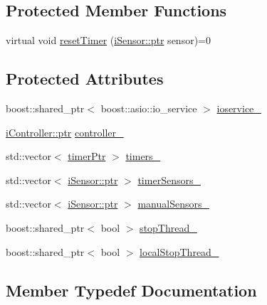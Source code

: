 \subsection*{Protected Member Functions}
\begin{DoxyCompactItemize}
\item 
virtual void \hyperlink{classo_cpt_1_1i_boatswain_a863c877ec067c55b5e06a04d0d9648ce}{reset\+Timer} (\hyperlink{classo_cpt_1_1i_sensor_a03533d2c5dc66e332d70dbb3b5e3006a}{i\+Sensor\+::ptr} sensor)=0
\end{DoxyCompactItemize}
\subsection*{Protected Attributes}
\begin{DoxyCompactItemize}
\item 
boost\+::shared\+\_\+ptr$<$ boost\+::asio\+::io\+\_\+service $>$ \hyperlink{classo_cpt_1_1i_boatswain_a95b337b39962f9c63fd82b500351a960}{ioservice\+\_\+}
\item 
\hyperlink{classo_cpt_1_1i_controller_a6d89a95cd6ad68bb74adfaca2f36370f}{i\+Controller\+::ptr} \hyperlink{classo_cpt_1_1i_boatswain_aafdc26c1366e4eee9cb156c5b6d705cf}{controller\+\_\+}
\item 
std\+::vector$<$ \hyperlink{classo_cpt_1_1i_boatswain_ac42d91dd3964880be9475ccaab4231cd}{timer\+Ptr} $>$ \hyperlink{classo_cpt_1_1i_boatswain_a22f6f6b95b832600c9dc1827589dca3c}{timers\+\_\+}
\item 
std\+::vector$<$ \hyperlink{classo_cpt_1_1i_sensor_a03533d2c5dc66e332d70dbb3b5e3006a}{i\+Sensor\+::ptr} $>$ \hyperlink{classo_cpt_1_1i_boatswain_ac25402266e3daa376e407a9f5ba73130}{timer\+Sensors\+\_\+}
\item 
std\+::vector$<$ \hyperlink{classo_cpt_1_1i_sensor_a03533d2c5dc66e332d70dbb3b5e3006a}{i\+Sensor\+::ptr} $>$ \hyperlink{classo_cpt_1_1i_boatswain_a1b58c7613d0dae24536f2db2e0510799}{manual\+Sensors\+\_\+}
\item 
boost\+::shared\+\_\+ptr$<$ bool $>$ \hyperlink{classo_cpt_1_1i_boatswain_a2fd1fb91df1788bb070ff4e7b7cf2c15}{stop\+Thread\+\_\+}
\item 
boost\+::shared\+\_\+ptr$<$ bool $>$ \hyperlink{classo_cpt_1_1i_boatswain_a38228671875f0c0ed945d2f44422d649}{local\+Stop\+Thread\+\_\+}
\end{DoxyCompactItemize}


\subsection{Member Typedef Documentation}

